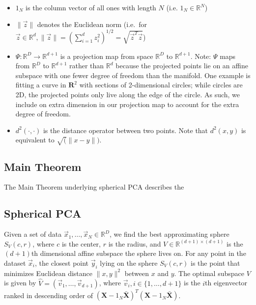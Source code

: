 \documentclass[]{article}
\begin{document}
\begin{itemize}
\item
  \(1_N\) is the column vector of all ones with length \(N\) (i.e.
  \(1_N \in \mathbb{R}^N\))
\item
  \(\| \vec{z} \|\) denotes the Euclidean norm (i.e.~for
  \(\vec{z} \in \mathbb{R}^d, \|\vec{z}\| = \left(\sum_{i = 1}^{d} z_i ^2 \right)^{1/2} = \sqrt{\vec{z}^T \vec{z}}\))
\item
  \(\Psi: \mathbb{R}^D \rightarrow \mathbb{R}^{d+1}\) is a projection
  map from space \(\mathbb{R}^D\) to \(\mathbb{R}^{d+1}\). Note:
  \(\Psi\) maps from \(\mathbb{R}^D\) to \(\mathbb{R}^{d+1}\) rather
  than \(\mathbb{R}^{d}\) because the projected points lie on an affine
  subspace with one fewer degree of freedom than the manifold. One
  example is fitting a curve in \(\mathbf{R}^2\) with sections of
  2-dimensional circles; while circles are 2D, the projected points only
  live along the edge of the circle. As such, we include on extra
  dimension in our projection map to account for the extra degree of
  freedom.
\item
  \(d^2(\cdot, \cdot)\) is the distance operator between two points.
  Note that \(d^2(x, y)\) is equivalent to \(\sqrt(\| x - y \|)\).
\end{itemize}

\subsection{Main Theorem}

The Main Theorem underlying spherical PCA describes the

\subsection{Spherical PCA}

Given a set of data \(\vec{x}_1, \dots, \vec{x}_N \in \mathbb{R}^D\), we
find the best approximating sphere \(S_{V}(c,r)\), where \(c\) is the
center, \(r\) is the radius, and
\(V \in \mathbb{R}^{(d+1) \times (d+1)}\) is the \((d+1)\)th dimensional
affine subspace the sphere lives on. For any point in the dataset
\(\vec{x}_i\), the closest point \(\vec{y}_i\) lying on the sphere
\(S_V(c,r)\) is the point that minimizes Euclidean distance
\(\|x,y\|^2\) between \(x\) and \(y\). The optimal subspace \(V\) is
given by \(\hat{V} = (\vec{v}_1, \dots, \vec{v}_{d+1})\), where
\(\vec{v}_i, i \in \{1,\dots,d+1\}\) is the \(i\)th eigenvector ranked
in descending order of
\((\mathbf{X} - 1_N\bar{\mathbf{X}})^T(\mathbf{X} - 1_N\bar{\mathbf{X}})\).
\end{document}
